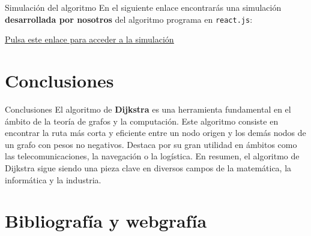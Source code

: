 \documentclass{beamer}
\begin{document}

    \begin{frame}{Simulación del algoritmo}
        En el siguiente enlace encontrarás una simulación \textbf{desarrollada por nosotros} del algoritmo programa en \texttt{react.js}: 
        \color{blue}\\ 
        \begin{center}\underline{\href{https://djkistra.vercel.app/}{Pulsa este enlace para acceder a la simulación}}\color{black}\end{center} 
        \color{black}
    \end{frame}

    \section{Conclusiones}


    \begin{frame}{Conclusiones}
        El algoritmo de \textbf{Dijkstra} es una herramienta fundamental en el ámbito de la teoría de grafos y la computación. Este algoritmo consiste en encontrar la ruta más corta y eficiente entre un nodo origen y los demás nodos de un grafo con pesos no negativos. Destaca por su gran utilidad en ámbitos como las telecomunicaciones, la navegación o la logística. En resumen, el algoritmo de Dijkstra sigue siendo una pieza clave en diversos campos de la matemática, la informática y la industria.
    \end{frame}

    \section{Bibliografía y webgrafía}

\end{document}
